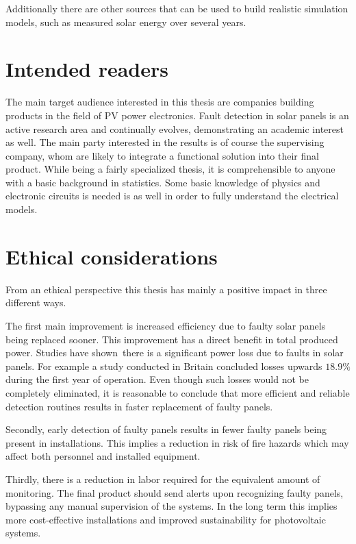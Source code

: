 Additionally there are other sources that can be used to build realistic simulation models, such as measured solar energy over several years.

\section{Intended readers}
The main target audience interested in this thesis are companies building products in the field of PV power electronics.
Fault detection in solar panels is an active research area and continually evolves, demonstrating an academic interest as well.
The main party interested in the results is of course the supervising company, whom are likely to
integrate a functional solution into their final product.
While being a fairly specialized thesis, it is comprehensible to anyone with a basic background in statistics.
Some basic knowledge of physics and electronic circuits is needed is as well in order to fully understand the electrical models.

\section{Ethical considerations}
From an ethical perspective this thesis has mainly a positive impact in three different ways.

The first main improvement is increased efficiency due to faulty solar panels being replaced sooner.
This improvement has a direct benefit in total produced power.
Studies have shown there is a significant power loss due to faults in solar panels.
For example a study conducted in Britain concluded losses upwards $18.9\%$ during the first year of operation\cite{Firth2010}.
Even though such losses would not be completely eliminated, it is reasonable to conclude that more efficient and reliable detection routines results in faster replacement of faulty panels.

Secondly, early detection of faulty panels results in fewer faulty panels being present in installations.
This implies a reduction in risk of fire hazards\cite{Zhao2010night} which may affect both personnel and installed equipment.

Thirdly, there is a reduction in labor required for the equivalent amount of monitoring.
The final product should send alerts upon recognizing faulty panels, bypassing any manual supervision of the systems.
In the long term this implies more cost-effective installations and improved sustainability for photovoltaic systems.

